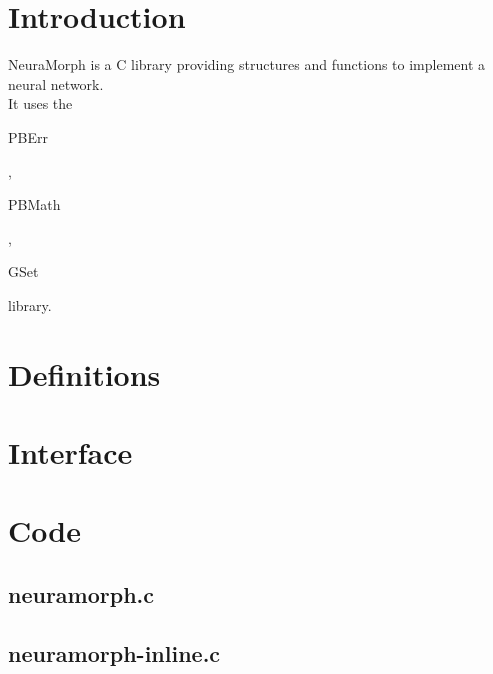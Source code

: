 \section*{Introduction}

NeuraMorph is a C library providing structures and functions to implement a neural network.\\ 

It uses the \begin{ttfamily}PBErr\end{ttfamily}, \begin{ttfamily}PBMath\end{ttfamily}, \begin{ttfamily}GSet\end{ttfamily} library.\\

\section{Definitions}

\section{Interface}

\begin{scriptsize}
\begin{ttfamily}

\end{ttfamily}
\end{scriptsize}

\section{Code}

\subsection{neuramorph.c}

\begin{scriptsize}
\begin{ttfamily}

\end{ttfamily}
\end{scriptsize}

\subsection{neuramorph-inline.c}

